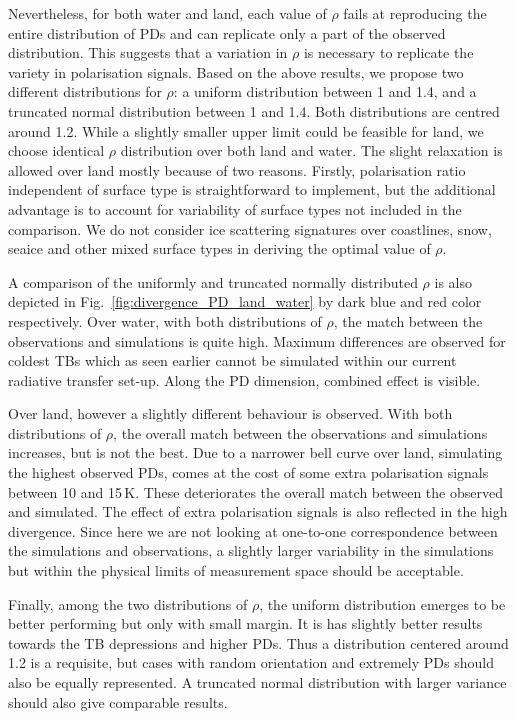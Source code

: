 \documentclass[amt, manuscript]{copernicus}
\begin{document}
Nevertheless, for both water and land, each value of $\rho$ fails at reproducing the entire distribution of PDs and can replicate only a part of the observed distribution. This suggests that a variation in $\rho$ is necessary to replicate the variety in polarisation signals. Based on the above results, we propose two different distributions for $\rho$: a uniform distribution between 1 and 1.4, and a truncated normal distribution between 1 and 1.4. Both distributions are centred around 1.2. While a slightly smaller upper limit could be feasible for land, we choose identical $\rho$ distribution over both land and water. The slight relaxation is allowed over land mostly because of two reasons. Firstly, polarisation ratio independent of surface type is straightforward to implement, but the additional advantage is to account for variability of surface types not included in the comparison. We do not consider ice scattering signatures over coastlines, snow, seaice and other mixed surface types in deriving the optimal value of $\rho$. 

A comparison of the uniformly and truncated normally distributed $\rho$ is also depicted in Fig.~\ref{fig:divergence_PD_land_water} by dark blue and red color respectively. Over water, with both distributions of $\rho$, the match between the observations and simulations is quite high. Maximum differences are observed for coldest TBs which as seen earlier cannot be simulated within our current radiative transfer set-up. Along the PD dimension, combined effect is visible.

Over land, however a slightly different behaviour is observed. With both distributions of $\rho$, the overall match between the observations and simulations increases, but is not the best. Due to a narrower bell curve over land, simulating the highest observed PDs, comes at the cost of some extra polarisation signals between 10 and 15\,K. These deteriorates the overall match between the observed and simulated. The effect of extra polarisation signals is also reflected in the high divergence. Since here we are not looking at one-to-one correspondence between the simulations and observations, a slightly larger variability in the simulations but within the physical limits of measurement space should be acceptable.

Finally, among the two distributions of $\rho$, the uniform distribution emerges to be better performing but only with small margin. It is has slightly better results towards the TB depressions and higher PDs. Thus a distribution centered around 1.2 is a requisite, but cases with random orientation and extremely PDs should also be equally represented. A truncated normal distribution with larger variance should also give comparable results. 
\end{document}
